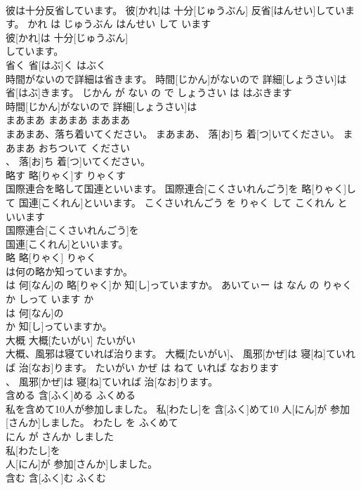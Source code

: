 \documentclass[8pt]{extreport}
\begin{document}
\begin{CJK}{UTF8}{min}
\\	彼は十分反省しています。	彼[かれ]は 十分[じゅうぶん] 反省[はんせい]しています。	かれ は じゅうぶん はんせい して います	
\\	彼[かれ]は 十分[じゅうぶん]
\\	しています。			
\\	省く	省[はぶ]く	はぶく	
\\	時間がないので詳細は省きます。	時間[じかん]がないので 詳細[しょうさい]は 省[はぶ]きます。	じかん が ない の で しょうさい は はぶきます	
\\	時間[じかん]がないので 詳細[しょうさい]は
\\	まあまあ	まあまあ	まあまあ	
\\	まあまあ、落ち着いてください。	まあまあ、 落[お]ち 着[つ]いてください。	まあまあ おちついて ください	
\\	、 落[お]ち 着[つ]いてください。			
\\	略す	略[りゃく]す	りゃくす	
\\	国際連合を略して国連といいます。	国際連合[こくさいれんごう]を 略[りゃく]して 国連[こくれん]といいます。	こくさいれんごう を りゃく して こくれん と いいます	
\\	国際連合[こくさいれんごう]を
\\	国連[こくれん]といいます。			
\\	略	略[りゃく]	りゃく	
\\	は何の略か知っていますか。	
\\	[あいてぃー]は 何[なん]の 略[りゃく]か 知[し]っていますか。	あいてぃー は なん の りゃく か しって います か	
\\	[あいてぃー]は 何[なん]の
\\	か 知[し]っていますか。			
\\	大概	大概[たいがい]	たいがい	
\\	大概、風邪は寝ていれば治ります。	大概[たいがい]、 風邪[かぜ]は 寝[ね]ていれば 治[なお]ります。	たいがい かぜ は ねて いれば なおります	
\\	、 風邪[かぜ]は 寝[ね]ていれば 治[なお]ります。			
\\	含める	含[ふく]める	ふくめる	
\\	私を含めて10人が参加しました。	私[わたし]を 含[ふく]めて10 人[にん]が 参加[さんか]しました。	わたし を ふくめて 
\\	にん が さんか しました	
\\	私[わたし]を
\\	人[にん]が 参加[さんか]しました。			
\\	含む	含[ふく]む	ふくむ	

\end{CJK}
\end{document}
